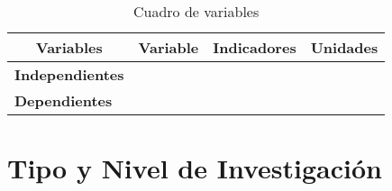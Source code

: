  \begin{table}[htbp]
 \caption{Cuadro de variables}\label{t1}
\begin{tabular}{lllccc}
\hline
\multicolumn{3}{c}{\textbf{Variables}}                       & \textbf{Variable}      & \textbf{Indicadores}                 & \textbf{Unidades} \\ \hline
\multicolumn{3}{c}{\multirow{2}{*}{\textbf{Independientes}}} &   &   & \\ \cline{4-6} 
\multicolumn{3}{c}{}                                         &   &   & \\ \hline
\multicolumn{3}{l}{\multirow{4}{*}{\textbf{Dependientes}}}   &   &   & \\ \cline{4-6} 
\multicolumn{3}{l}{}                                         &   &   & \\ \cline{4-6} 
\multicolumn{3}{l}{}                                         &   &   & \\ \cline{4-6} 
\multicolumn{3}{l}{}                                         &   &   & \\ \hline
\end{tabular}
\end{table}

\section{Tipo y Nivel de Investigación}



